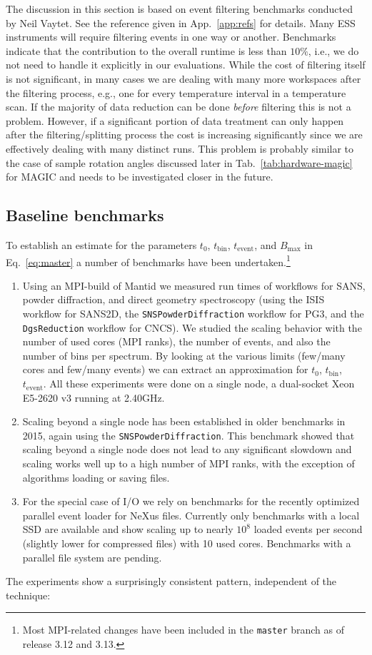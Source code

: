 \documentclass[a4paper,english,numbers=noenddot,bibliography=totoc,chapterprefix=on,DIV=12]{scrartcl}
\newcommand{\Tbin}{t_{\text{bin}}}
\newcommand{\Tevent}{t_{\text{event}}}
\newcommand{\Bmax}{B_{\text{max}}}
\newcommand{\magic}{MAGIC\xspace}
\newcommand{\mantid}{Mantid\xspace}
\newcommand{\nexus}{NeXus\xspace}
\begin{document}
The discussion in this section is based on event filtering benchmarks conducted by Neil Vaytet.
See the reference given in App.~\ref{app:refs} for details.
Many ESS instruments will require filtering events in one way or another.
Benchmarks indicate that the contribution to the overall runtime is less than $10\%$, i.e., we do not need to handle it explicitly in our evaluations.
While the cost of filtering itself is not significant, in many cases we are dealing with many more workspaces after the filtering process, e.g., one for every temperature interval in a temperature scan.
If the majority of data reduction can be done \emph{before} filtering this is not a problem.
However, if a significant portion of data treatment can only happen after the filtering/splitting process the cost is increasing significantly since we are effectively dealing with many distinct runs.
This problem is probably similar to the case of sample rotation angles discussed later in Tab.~\ref{tab:hardware-magic} for \magic and needs to be investigated closer in the future.


\subsection{Baseline benchmarks}
\label{sec:benchmarks}

To establish an estimate for the parameters $t_0$, $\Tbin$, $\Tevent$, and $\Bmax$ in Eq.~\eqref{eq:master} a number of benchmarks have been undertaken.\footnote{Most MPI-related changes have been included in the \verb|master| branch as of release 3.12 and 3.13.}

\begin{enumerate}
  \item Using an MPI-build of \mantid we measured run times of workflows for SANS, powder diffraction, and direct geometry spectroscopy (using the ISIS workflow for SANS2D, the \verb|SNSPowderDiffraction| workflow for PG3, and the \verb|DgsReduction| workflow for CNCS).
    We studied the scaling behavior with the number of used cores (MPI ranks), the number of events, and also the number of bins per spectrum.
    By looking at the various limits (few/many cores and few/many events) we can extract an approximation for $t_0$, $\Tbin$, $\Tevent$.
    All these experiments were done on a single node, a dual-socket Xeon E5-2620 v3 running at 2.40GHz.
  \item Scaling beyond a single node has been established in older benchmarks in 2015, again using the \verb|SNSPowderDiffraction|.
    This benchmark showed that scaling beyond a single node does not lead to any significant slowdown and scaling works well up to a high number of MPI ranks, with the exception of algorithms loading or saving files.
  \item For the special case of I/O we rely on benchmarks for the recently optimized parallel event loader for \nexus files.
    Currently only benchmarks with a local SSD are available and show scaling up to nearly $10^8$ loaded events per second (slightly lower for compressed files) with 10 used cores.
    Benchmarks with a parallel file system are pending.
\end{enumerate}
The experiments show a surprisingly consistent pattern, independent of the technique:
\end{document}
